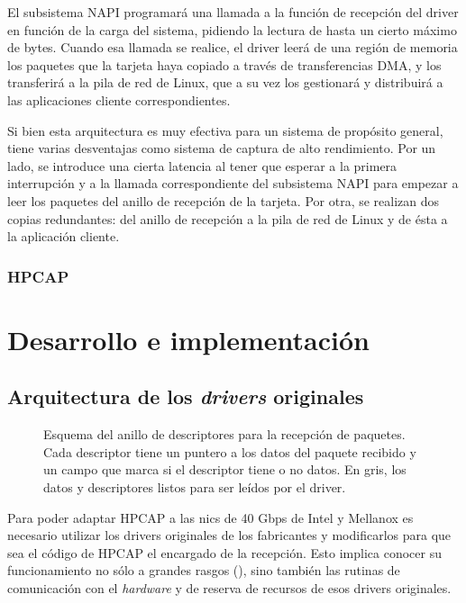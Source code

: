 \documentclass[oneside, draft]{epstfg}
\begin{document}
El subsistema \gls{NAPI} programará una llamada a la función de recepción del \gls{driver} en función de la carga del sistema, pidiendo la lectura de hasta un cierto máximo de bytes. Cuando esa llamada se realice, el \gls{driver} leerá de una región de memoria los paquetes que la tarjeta haya copiado a través de transferencias DMA, y los transferirá a la pila de red de Linux, que a su vez los gestionará y distribuirá a las aplicaciones cliente correspondientes.

Si bien esta arquitectura es muy efectiva para un sistema de propósito general, tiene varias desventajas como sistema de captura de alto rendimiento. Por un lado, se introduce una cierta latencia al tener que esperar a la primera interrupción y a la llamada correspondiente del subsistema NAPI para empezar a leer los paquetes del anillo de recepción de la tarjeta. Por otra, se realizan dos copias redundantes: del anillo de recepción a la pila de red de Linux y de ésta a la aplicación cliente.

\subsection{HPCAP}

\chapter{Desarrollo e implementación}

\section{Arquitectura de los \textit{drivers} originales}
\label{sec:ArquitecturaOriginal}

\begin{figure}[btp]
\centering

\caption[Esquema del anillo de descriptores para recepción de paquetes]{Esquema del anillo de descriptores para la recepción de paquetes. Cada descriptor tiene un puntero a los datos del paquete recibido y un campo que marca si el descriptor tiene o no datos. En gris, los datos y descriptores listos para ser leídos por el \gls{driver}.}
\label{fig:DriverRings}
\end{figure}

Para poder adaptar HPCAP a las \glspl{nic} de 40 Gbps de Intel y Mellanox es necesario utilizar los \glspl{driver} originales de los fabricantes y modificarlos para que sea el código de HPCAP el encargado de la recepción. Esto implica conocer su funcionamiento no sólo a grandes rasgos (), sino también las rutinas de comunicación con el \textit{hardware} y de reserva de recursos de esos \glspl{driver} originales.
\end{document}
